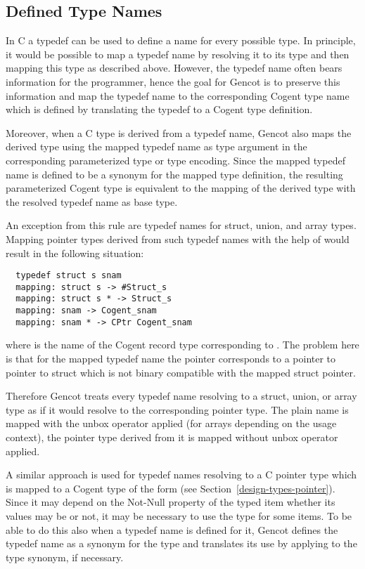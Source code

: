 \subsection{Defined Type Names}
\label{design-types-typedef}

In C a typedef can be used to define a name for every possible type. In principle, it would be possible to
map a typedef name by resolving it to its type and then mapping this type as described above. However, the
typedef name often bears information for the programmer, hence the goal for Gencot is to preserve this information
and map the typedef name to the corresponding Cogent type name which is defined by translating the typedef
to a Cogent type definition.

Moreover, when a C type is derived from a typedef name, Gencot also maps the derived type using the mapped typedef name
as type argument in the corresponding parameterized type or type encoding. Since the mapped typedef name is defined to be a synonym 
for the mapped type definition, the resulting parameterized Cogent type is equivalent to the mapping of the derived 
type with the resolved typedef name as base type.

An exception from this rule are typedef names for struct, union, and array types. Mapping pointer types derived 
from such typedef names with the help of  would result in the following situation:
\begin{verbatim}
  typedef struct s snam
  mapping: struct s -> #Struct_s
  mapping: struct s * -> Struct_s
  mapping: snam -> Cogent_snam
  mapping: snam * -> CPtr Cogent_snam
\end{verbatim}
where  is the name of the Cogent record type corresponding to . The problem here
is that for the mapped typedef name the pointer corresponds to a pointer to pointer to struct which is not binary 
compatible with the mapped struct pointer.

Therefore Gencot treats every typedef name resolving to a struct, union, or array type as if 
it would resolve to the corresponding pointer type. The plain name is mapped with the unbox operator 
applied (for arrays depending on the usage context), the pointer type derived from it is mapped without 
unbox operator applied. 

A similar approach is used for typedef names resolving to a C pointer type which is mapped to a Cogent type of the 
form  (see Section~\ref{design-types-pointer}). Since it may depend on the Not-Null property of the 
typed item whether its values may be  or not, it may be necessary to use the type  for some items.
To be able to do this also when a typedef name is defined for it, Gencot defines the typedef name as a synonym 
for the type  and translates its use by applying  to the type synonym, if necessary.

